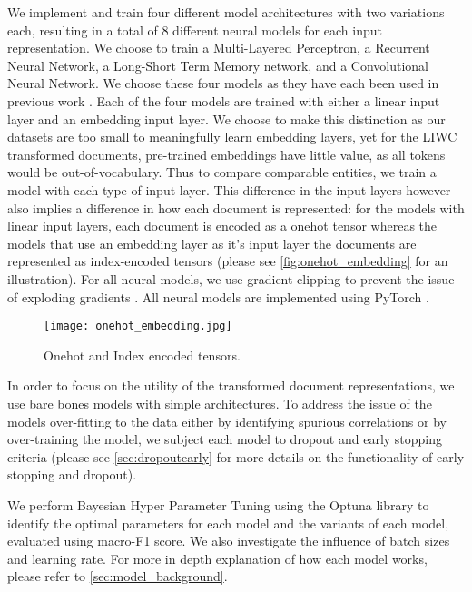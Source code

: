 We implement and train four different model architectures with two variations each, resulting in a total of 8 different neural models for each input representation. We choose to train a Multi-Layered Perceptron, a Recurrent Neural Network, a Long-Short Term Memory network, and a Convolutional Neural Network. We choose these four models as they have each been used in previous work \cite{CITE: Find papers with Neural approaches for each of the models}. Each of the four models are trained with either a linear input layer and an embedding input layer. We choose to make this distinction as our datasets are too small to meaningfully learn embedding layers, yet for the LIWC transformed documents, pre-trained embeddings have little value, as all tokens would be out-of-vocabulary. Thus to compare comparable entities, we train a model with each type of input layer. This difference in the input layers however also implies a difference in how each document is represented: for the models with linear input layers, each document is encoded as a onehot tensor whereas the models that use an embedding layer as it's input layer the documents are represented as index-encoded tensors (please see \autoref{fig:onehot_embedding} for an illustration). For all neural models, we use gradient clipping to prevent the issue of exploding gradients \cite{Bengio:1994}. All neural models are implemented using PyTorch \cite{CITE: Pytorch paper}.

\begin{figure}
  \centering
  \texttt{[image: onehot\_embedding.jpg]}
  \caption{Onehot and Index encoded tensors.}
  \label{fig:onehot_embedding}
\end{figure}

In order to focus on the utility of the transformed document representations, we use bare bones models with simple architectures. To address the issue of the models over-fitting to the data either by identifying spurious correlations or by over-training the model, we subject each model to dropout and early stopping criteria (please see \autoref{sec:dropoutearly} for more details on the functionality of early stopping and dropout).

We perform Bayesian Hyper Parameter Tuning using the Optuna library \cite{Optuna:2019} to identify the optimal parameters for each model and the variants of each model, evaluated using macro-F1 score. We also investigate the influence of batch sizes and learning rate. For more in depth explanation of how each model works, please refer to \autoref{sec:model_background}.\vspace{5mm}

